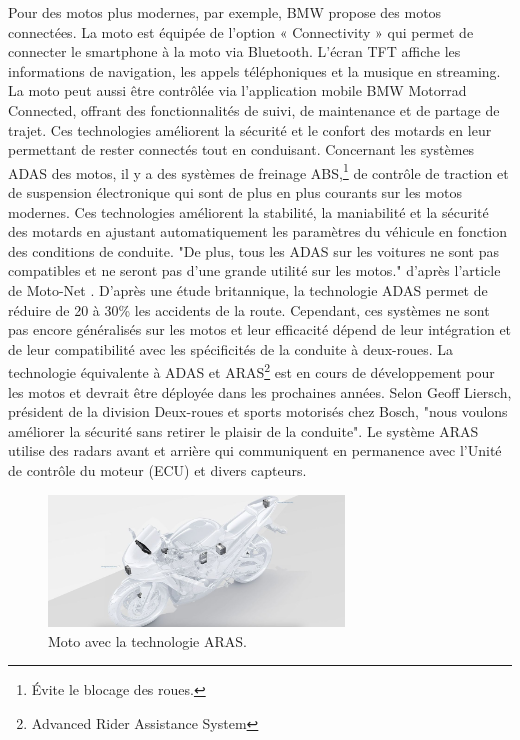Pour des motos plus modernes, par exemple, BMW propose des motos connectées\cite{bmw_adas}. La moto est équipée de l’option « Connectivity » qui permet de connecter le smartphone à la moto via Bluetooth. L’écran TFT affiche les informations de navigation, les appels téléphoniques et la musique en streaming. La moto peut aussi être contrôlée via l’application mobile BMW Motorrad Connected, offrant des fonctionnalités de suivi, de maintenance et de partage de trajet. Ces technologies améliorent la sécurité et le confort des motards en leur permettant de rester connectés tout en conduisant.
Concernant les systèmes ADAS des motos\cite{moto_adas}, il y a des systèmes de freinage ABS,\footnote{Évite le blocage des roues.} de contrôle de traction et de suspension électronique qui sont de plus en plus courants sur les motos modernes. Ces technologies améliorent la stabilité, la maniabilité et la sécurité des motards en ajustant automatiquement les paramètres du véhicule en fonction des conditions de conduite. "De plus, tous les ADAS sur les voitures ne sont pas compatibles et ne seront pas d’une grande utilité sur les motos." d'après l'article de Moto-Net \cite{moto_adas}.
D'après une étude britannique, la technologie ADAS permet de réduire de 20 à 30\%\cite{moto_aras} les accidents de la route. Cependant, ces systèmes ne sont pas encore généralisés sur les motos et leur efficacité dépend de leur intégration et de leur compatibilité avec les spécificités de la conduite à deux-roues. La technologie équivalente à ADAS et ARAS\footnote{Advanced Rider Assistance System} est en cours de développement pour les motos et devrait être déployée dans les prochaines années.
Selon Geoff Liersch, président de la division Deux-roues et sports motorisés chez Bosch, "nous voulons améliorer la sécurité sans retirer le plaisir de la conduite"\cite{aras_bosh}.
Le système ARAS utilise des radars avant et arrière qui communiquent en permanence avec l’Unité de contrôle du moteur (ECU) et divers capteurs.

\begin{figure}[H]
    \centering
    \includegraphics[width=0.7\textwidth]{images/aras_moto.jpeg} 
    \caption{Moto avec la technologie ARAS.}
\end{figure}

